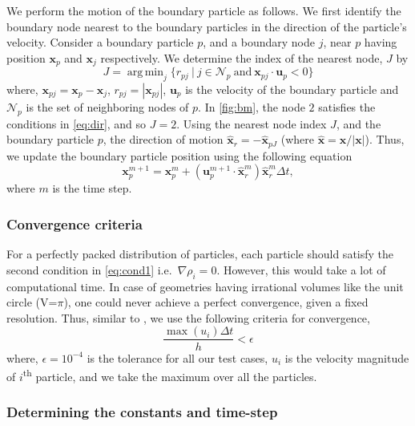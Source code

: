 \documentclass[preprint,12pt]{elsarticle}
\newcommand{\ten}[1]{\ensuremath{\mathbf{#1}}}
\DeclareMathOperator*{\argmin}{arg\,min}
\begin{document}
We perform the motion of the boundary particle as follows. We first identify
the boundary node nearest to the boundary particles in the direction of the
particle's velocity. Consider a boundary particle $p$, and a boundary node
$j$, near $p$ having position $\ten{x}_{p}$ and $\ten{x}_j$ respectively. We
determine the index of the nearest node, $J$ by
\begin{equation}
  \label{eq:dir}
  J = \argmin_j \{r_{pj}\ |\ j \in \mathcal{N}_{p}\ \text{and} \
    \ten{x}_{pj} \cdot \ten{u}_{p} < 0\}
\end{equation}
where, $\ten{x}_{pj} = \ten{x}_p - \ten{x}_j$, $r_{pj} = |\ten{x}_{pj}|$,
$\ten{u}_p$ is the velocity of the boundary particle and $\mathcal{N}_p$ is
the set of neighboring nodes of $p$. In \cref{fig:bm}, the node $2$ satisfies
the conditions in \cref{eq:dir}, and so $J=2$. Using the nearest node index
$J$, and the boundary particle $p$, the direction of motion $\hat{\ten{x}}_r
= -\hat{\ten{x}}_{pJ}$ (where $\hat{\ten{x}} = \ten{x}/|\ten{x}|$). Thus, we
update the boundary particle position using the following equation
\begin{equation}
  \label{eq:int_solid}
  \ten{x}_{p}^{m+1} = \ten{x}_{p}^m +  (\ten{u}_{p}^{m+1} \cdot \hat{\ten{x}}^m_{r})\hat{\ten{x}}^m_{r} \Delta t,
\end{equation}
where $m$ is the time step.

\subsubsection{Convergence criteria} \label{subsec:conv}

For a perfectly packed distribution of particles, each particle should satisfy
the second condition in \cref{eq:cond1} i.e.\ $\nabla \rho_i = 0$.
However, this would take a lot of computational time. In case of geometries
having irrational volumes like the unit circle (V=$\pi$), one could never
achieve a perfect convergence, given a fixed resolution. Thus, similar to
\cite{jiang2015blue}, we use the following criteria for convergence,
\begin{equation}
  \label{eq:conv}
  \frac{\max(u_{i}) \Delta t}{h} < \epsilon
\end{equation}
where, $\epsilon=10^{-4}$ is the tolerance for all our test cases, $u_{i}$ is
the velocity magnitude of $i$\textsuperscript{th} particle, and we take the maximum over all the particles.


\subsubsection{Determining the constants and time-step}
\label{subsec:time}
\end{document}
